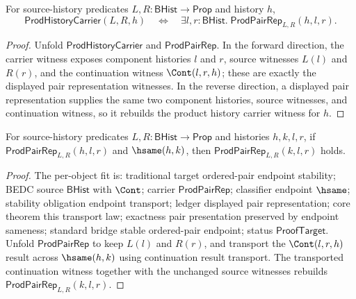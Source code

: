 \begin{theorem}
\label{thm:prod-pair-rep-coverage}
For source-history predicates $L,R:\mathsf{BHist}\to\mathsf{Prop}$ and history $h$,
$$
  \mathsf{ProdHistoryCarrier}(L,R,h)
  \quad\Longleftrightarrow\quad
  \exists l,r:\mathsf{BHist}.\;\mathsf{ProdPairRep}_{L,R}(h,l,r).
$$
\end{theorem}
\begin{proof}
Unfold $\mathsf{ProdHistoryCarrier}$ and $\mathsf{ProdPairRep}$. In the forward direction, the carrier witness exposes component histories $l$ and $r$, source witnesses $L(l)$ and $R(r)$, and the continuation witness $\Cont(l,r,h)$; these are exactly the displayed pair representation witnesses. In the reverse direction, a displayed pair representation supplies the same two component histories, source witnesses, and continuation witness, so it rebuilds the product history carrier witness for $h$.
\end{proof}

\begin{theorem}
\label{thm:prod-pair-rep-hsame-transport}
For source-history predicates $L,R:\mathsf{BHist}\to\mathsf{Prop}$ and histories
$h,k,l,r$, if $\mathsf{ProdPairRep}_{L,R}(h,l,r)$ and $\hsame(h,k)$, then
$\mathsf{ProdPairRep}_{L,R}(k,l,r)$ holds.
\end{theorem}
\begin{proof}
The per-object fit is: traditional target ordered-pair endpoint stability; BEDC
source $\mathsf{BHist}$ with $\Cont$; carrier $\mathsf{ProdPairRep}$;
classifier endpoint $\hsame$; stability obligation endpoint transport; ledger
displayed pair representation; core theorem this transport law; exactness pair
presentation preserved by endpoint sameness; standard bridge stable ordered-pair
endpoint; status $\mathsf{ProofTarget}$. Unfold $\mathsf{ProdPairRep}$ to keep
$L(l)$ and $R(r)$, and transport the $\Cont(l,r,h)$ result across $\hsame(h,k)$
using continuation result transport. The transported continuation witness
together with the unchanged source witnesses rebuilds
$\mathsf{ProdPairRep}_{L,R}(k,l,r)$.
\end{proof}

